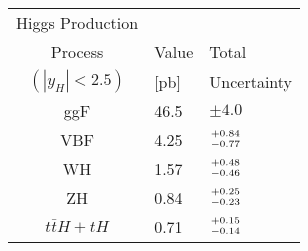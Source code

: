 \begin{table}
\centering
\scriptsize
\begin{tabular}{|c|l|l|}
    \hline
    Higgs Production &          &                       \\
    Process          &   Value  &  Total                \\
    $(|y_H| < 2.5)$  &    [pb]  &  Uncertainty          \\
    \hline
    ggF              &    46.5  &  $\pm4.0$             \\
    VBF              &    4.25  &  $+0.84 \atop -0.77$  \\
    WH               &    1.57  &  $+0.48 \atop -0.46$  \\
    ZH               &    0.84  &  $+0.25 \atop -0.23$  \\
    $t\bar{t}H+tH$   &    0.71  &  $+0.15 \atop -0.14$  \\
    \hline
\end{tabular}
\end{table}
